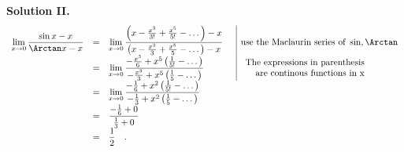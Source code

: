 \noindent \textbf{Solution II.}
\[
\begin{array}{rcll|l}
\displaystyle \lim\limits_{x\to 0}\frac{\sin x- x}{\Arctan x -x}&=&\displaystyle \lim\limits_{x\to 0} \frac{\left( x-\frac{x^3}{3!}+\frac{x^5}{5!}-\dots\right) -x}{\left( x-\frac{x^3}{3}+\frac{x^5}{5}-\dots\right)-x} &&\text{use the Maclaurin series of }\sin, \Arctan \\
&=&\displaystyle \lim\limits_{x\to 0}\frac{- \frac{x^3 }{6} + x^5\left(\frac{1}{5!}-\dots\right) }{- \frac{ x^3}{3} + x^5 \left(\frac{1}{5}-\dots \right)  }&& \begin{array}{rcl}
\text{The expressions in parenthesis }\\
\text{are continous functions in x }
\end{array}\\
&=&\displaystyle \lim\limits_{x\to 0} \frac{-\frac{1}{6}+ x^2 \left(\frac{1}{5!}-\dots\right) }{- \frac{1}{3} +x^2 \left( \frac{1}{5}-\dots \right)  }\\
&=&\displaystyle \frac{-\frac{1}{6}+0}{\frac{1}{3}+0}\\
&=&\displaystyle \frac{1}{2}\quad .
\end{array}
\] 


